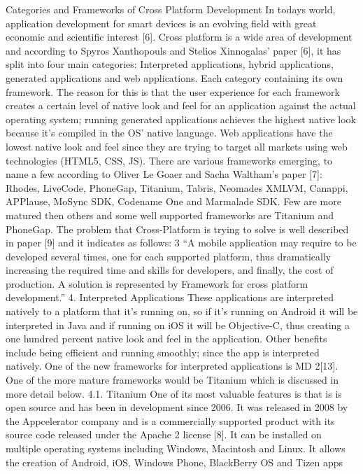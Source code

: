 Categories and Frameworks of Cross Platform Development
In todays world, application development for smart devices is an evolving
field with great economic and scientific interest [6]. Cross platform is a wide
area of development and according to Spyros Xanthopouls and Stelios
Xinnogalas’ paper [6], it has split into four main categories: Interpreted
applications, hybrid applications, generated applications and web
applications. Each category containing its own framework. The reason for
this is that the user experience for each framework creates a certain level of
native look and feel for an application against the actual operating system;
running generated applications achieves the highest native look because it’s
compiled in the OS’ native language. Web applications have the lowest native
look and feel since they are trying to target all markets using web
technologies (HTML5, CSS, JS). There are various frameworks emerging, to
name a few according to Oliver Le Goaer and Sacha Waltham’s paper [7]:
Rhodes, LiveCode, PhoneGap, Titanium, Tabris, Neomades XMLVM, Canappi,
APPlause, MoSync SDK, Codename One and Marmalade SDK. Few are more
matured then others and some well supported frameworks are Titanium and
PhoneGap. The problem that Cross-Platform is trying to solve is well
described in paper [9] and it indicates as follows:
3
“A mobile application may require to be developed several times,
one for each supported platform, thus dramatically increasing
the required time and skills for developers, and finally, the cost
of production. A solution is represented by Framework for cross
platform development.”
4. Interpreted Applications
These applications are interpreted natively to a platform that it’s running
on, so if it’s running on Android it will be interpreted in Java and if running
on iOS it will be Objective-C, thus creating a one hundred percent native look
and feel in the application. Other benefits include being efficient and running
smoothly; since the app is interpreted natively. One of the new frameworks
for interpreted applications is MD 2[13]. One of the more mature frameworks
would be Titanium which is discussed in more detail below.
4.1. Titanium
One of its most valuable features is that is is open source and has been in
development since 2006. It was released in 2008 by the Appcelerator
company and is a commercially supported product with its source code
released under the Apache 2 license [8]. It can be installed on multiple
operating systems including Windows, Macintosh and Linux. It allows the
creation of Android, iOS, Windows Phone, BlackBerry OS and Tizen apps
